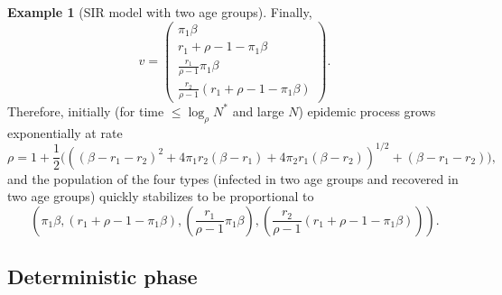\documentclass{article}
\theoremstyle{definition}
\newtheorem{example}{Example}
\begin{document}
\begin{example}[SIR model with two age groups]
Finally, 
\[v = \left (\begin{matrix}\pi_1 \beta  \\ r_1+\rho - 1 - \pi_1\beta \\ \frac{r_1}{\rho-1} \pi_1 \beta  \\ \frac{r_2}{\rho-1} ( r_1+\rho - 1 - \pi_1\beta) \end{matrix} \right). \]
 Therefore, initially (for time $ \leq \log_{\rho}N^*$ and large $N$) epidemic process grows exponentially at rate 
 \[
 \rho =1+\frac{1}{2}\big( \left ((\beta-r_1-r_2)^2+4\pi_1r_2(\beta-r_1)+4\pi_2r_1(\beta-r_2) \right )^{1/2}+(\beta-r_1-r_2)\big),
 \]
  and the population of the four types (infected in two age groups and recovered in two age groups)
  quickly stabilizes to be proportional to $$\left(\pi_1 \beta, ( r_1+\rho - 1 - \pi_1\beta), (\frac{r_1}{\rho-1} \pi_1 \beta ), ( \frac{r_2}{\rho-1} ( r_1+\rho - 1 - \pi_1\beta)) \right).$$
\end{example}

\subsection{Deterministic phase}
\label{deterministic_results}
\end{document}
